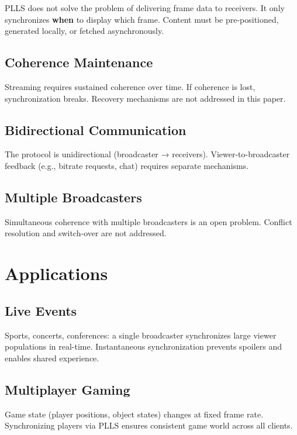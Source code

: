 \documentclass[twocolumn,10pt,a4paper]{article}
\theoremstyle{plain}
\theoremstyle{definition}
\begin{document}
PLLS does not solve the problem of delivering frame data to receivers. It only synchronizes \textbf{when} to display which frame. Content must be pre-positioned, generated locally, or fetched asynchronously.

\subsection{Coherence Maintenance}

Streaming requires sustained coherence over time. If coherence is lost, synchronization breaks. Recovery mechanisms are not addressed in this paper.

\subsection{Bidirectional Communication}

The protocol is unidirectional (broadcaster → receivers). Viewer-to-broadcaster feedback (e.g., bitrate requests, chat) requires separate mechanisms.

\subsection{Multiple Broadcasters}

Simultaneous coherence with multiple broadcasters is an open problem. Conflict resolution and switch-over are not addressed.

\section{Applications}
\label{sec:applications}

\subsection{Live Events}

Sports, concerts, conferences: a single broadcaster synchronizes large viewer populations in real-time. Instantaneous synchronization prevents spoilers and enables shared experience.

\subsection{Multiplayer Gaming}

Game state (player positions, object states) changes at fixed frame rate. Synchronizing players via PLLS ensures consistent game world across all clients.
\end{document}
